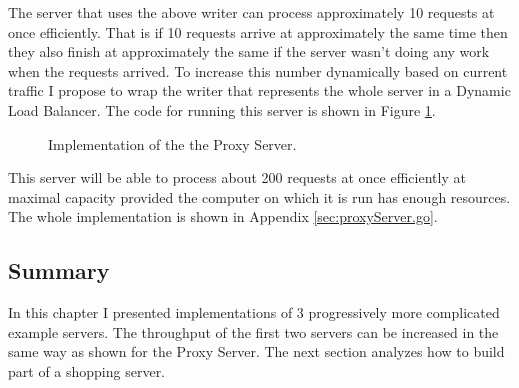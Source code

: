 \newpage
The server that uses the above writer can process approximately 10 requests
at once efficiently. That is if 10 requests arrive at approximately the same
time then they also finish at approximately the same if the server wasn't
doing any work when the requests arrived.
To increase this number dynamically based on current traffic I propose
to wrap the writer that represents the whole server in a Dynamic Load
Balancer. The code for running this server is shown in Figure 
\ref{fig:ProxyServerImpl}.
\begin{figure}[h]
 
\caption[scale=1.0]{Implementation of the the Proxy Server.}
\label{fig:ProxyServerImpl}
\end{figure}

This server will be able to process about 200 requests at once efficiently
at maximal capacity provided the computer on which it is run has enough resources.
The whole implementation is shown in Appendix \ref{sec:proxyServer.go}.

\subsection{Summary}
In this chapter I presented implementations of 3 progressively more 
complicated example servers. The throughput of the first two servers
can be increased in the same way as shown for the Proxy Server. The 
next section analyzes how to build part of a shopping server.


